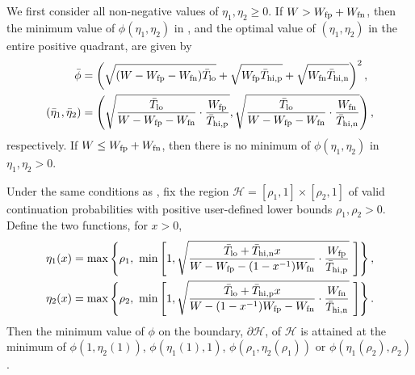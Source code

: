 \documentclass[review]{siamonline190516}
\begin{document}
\begin{lemma}
\label{etastar:unbounded}
 We first consider all non-negative values of $\eta_1, \eta_2 \geq 0$. 
 If $W > W_{\mathrm{fp}} + W_{\mathrm{fn}}$, then the minimum value of $\phi(\eta_1,\eta_2)$ in , and the optimal value of $(\eta_1, \eta_2)$ in the entire positive quadrant, are given by
 \begin{subequations}
 \label{eq:etastar:unbounded}
 \begin{align}
  \bar \phi &= \left( \sqrt{(W - W_{\mathrm{fp}} - W_{\mathrm{fn}}) \bar T_{\mathrm{lo}}} + \sqrt{W_{\mathrm{fp}} \bar T_{\mathrm{hi, p}}} + \sqrt{W_{\mathrm{fn}} \bar T_{\mathrm{hi, n}}} \right)^2, \\
  \left( \bar \eta_1, \bar \eta_2 \right) &= \left( 
  	\sqrt{ \frac{\bar T_{\mathrm{lo}}}{W - W_{\mathrm{fp}} - W_{\mathrm{fn}}} \cdot \frac{W_{\mathrm{fp}}}{\bar T_{\mathrm{hi, p}} }},
	\sqrt{ \frac{\bar T_{\mathrm{lo}}}{W - W_{\mathrm{fp}} - W_{\mathrm{fn}}} \cdot \frac{W_{\mathrm{fn}}}{\bar T_{\mathrm{hi, n}} }}
  \right),
 \end{align}
 \end{subequations}
 respectively.
 If $W \leq W_{\mathrm{fp}} + W_{\mathrm{fn}}$, then there is no minimum of $\phi(\eta_1,\eta_2)$ in $\eta_1, \eta_2 > 0$.
\end{lemma}

\begin{lemma}
\label{etastar:boundary} 
 Under the same conditions as , fix the region $\mathcal H = [\rho_1, 1] \times [\rho_2, 1]$ of valid continuation probabilities with positive user-defined lower bounds $\rho_1, \rho_2 > 0$.
Define the two functions, for $x>0$,
\begin{subequations}
\label{eq:etastar:boundary}
\begin{align}
\eta_1(x) &= \max \left\{ \rho_1, ~\min \left[ 1, 
\sqrt{\frac{\bar T_{\mathrm{lo}} + \bar T_{\mathrm{hi}, \mathrm{n}} x }{W - W_{\mathrm{fp}} - (1-x^{-1})W_{\mathrm{fn}}} \cdot \frac{W_{\mathrm{fp}}}{\bar T_{\mathrm{hi}, \mathrm p}}} ~
\right] \right\}, \\
\eta_2(x) &= \max \left\{ \rho_2, ~\min \left[ 1, 
\sqrt{\frac{\bar T_{\mathrm{lo}} + \bar T_{\mathrm{hi}, \mathrm{p}} x }{W - (1-x^{-1}) W_{\mathrm{fp}} - W_{\mathrm{fn}}} \cdot \frac{W_{\mathrm{fn}}}{\bar T_{\mathrm{hi}, \mathrm n}}} ~
 \right] \right\}.
\end{align}
\end{subequations}
Then the minimum value of $\phi$ on the boundary, $\partial \mathcal H$, of $\mathcal H$ is attained at the minimum of $\phi(1, \eta_2(1))$, $\phi(\eta_1(1), 1)$, $\phi(\rho_1, \eta_2(\rho_1))$ or $\phi(\eta_1(\rho_2), \rho_2)$.
\end{lemma}
 
\end{document}
